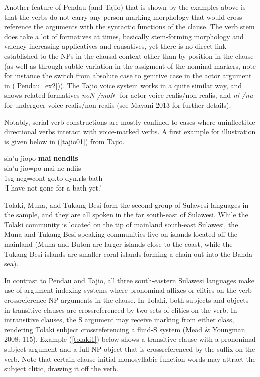 Another feature of Pendau (and Tajio) that is shown by the examples above is that the verbs do not carry any person-marking morphology that would cross-reference the arguments with the syntactic functions of the clause. The verb stem does take a lot of formatives at times, basically stem-forming morphology and valency-increasing applicatives and causatives, yet there is no direct link established to the NPs in the clausal context other than by position in the clause (as well as through subtle variation in the assigment of the nominal markers, note for instance the switch from absolute case to genitive case in the actor argument in (\ref{Pendau_ex2})). The Tajio voice system works in a quite similar way, and shows related formatives \textit{noN-/moN-} for actor voice realis/non-realis, and \textit{ni-/nu-} for undergoer voice realis/non-realis (see Mayani 2013 for further details). 

Notably, serial verb constructions are mostly confined to cases where uninflectible directional verbs interact with voice-marked verbs. A first example for illustration is given below in (\ref{tajio01}) from Tajio.

\ea \label{tajio01}
\glll sia’u jiopo \textbf{mai} \textbf{nendiis} \\
sia’u jio=po mai ne-ndiis \\
 \acs{1}\acs{sg} \acs{neg}=\acs{cont} go.to \acs{dyn}.\acs{rls}-bath\\
\glft ‘I have not gone for a bath yet.’ \\ 
\z
\xe

Tolaki, Muna, and Tukang Besi form the second group of Sulawesi languages in the sample, and they are all spoken in the far south-east of Sulawesi. While the Tolaki community is located on the tip of mainland south-east Sulawesi, the Muna and Tukang Besi speaking communities live on islands located off the mainland (Muna and Buton are larger islands close to the coast, while the Tukang Besi islands are smaller coral islands forming a chain out into the Banda sea). 

In contrast to Pendau and Tajio, all three south-eastern Sulawesi languages make use of argument indexing systems where pronominal affixes or clitics on the verb crossreference NP arguments in the clause. In Tolaki, both subjects and objects in transitive clauses are crossreferenced by two sets of clitics on the verb. In intransitive clauses, the S argument may receive marking from either class, rendering Tolaki subject crossreferencing a fluid-S system (Mead \& Youngman 2008: 115). Example (\ref{tolaki1}) below shows a transitive clause with a prononimal subject argument and a full NP object that is crossreferenced by the suffix on the verb. Note that certain clause-initial monosyllabic function words may attract the subject clitic, drawing it off the verb.

